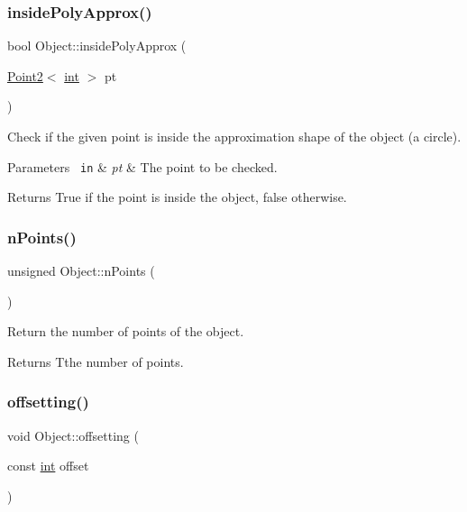 \subsubsection{\texorpdfstring{insidePolyApprox()}{insidePolyApprox()}}
{\footnotesize\ttfamily bool Object\+::inside\+Poly\+Approx (\begin{DoxyParamCaption}\item[{\mbox{\hyperlink{class_point2}{Point2}}$<$ \mbox{\hyperlink{draw_8hh_aa620a13339ac3a1177c86edc549fda9b}{int}} $>$}]{pt }\end{DoxyParamCaption})}



Check if the given point is inside the approximation shape of the object (a circle). 


\begin{DoxyParams}[1]{Parameters}
\mbox{\texttt{ in}}  & {\em pt} & The point to be checked. \\
\hline
\end{DoxyParams}
\begin{DoxyReturn}{Returns}
True if the point is inside the object, false otherwise. 
\end{DoxyReturn}
\mbox{\label{class_object_ae4bc2b4ca7923f4f894c4b12979ee56f}} 
\subsubsection{\texorpdfstring{nPoints()}{nPoints()}}
{\footnotesize\ttfamily unsigned Object\+::n\+Points (\begin{DoxyParamCaption}{ }\end{DoxyParamCaption})}



Return the number of points of the object. 

\begin{DoxyReturn}{Returns}
Tthe number of points. 
\end{DoxyReturn}
\mbox{\label{class_object_a9cee85749dbecb460a9449b8e6bb674d}} 
\subsubsection{\texorpdfstring{offsetting()}{offsetting()}}
{\footnotesize\ttfamily void Object\+::offsetting (\begin{DoxyParamCaption}\item[{const \mbox{\hyperlink{draw_8hh_aa620a13339ac3a1177c86edc549fda9b}{int}}}]{offset }\end{DoxyParamCaption})}



